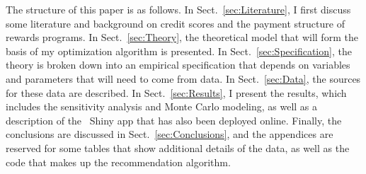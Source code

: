 The structure of this paper is as follows. 
In Sect.~\ref{sec:Literature}, I first discuss some literature and background on credit scores and the payment structure of rewards programs. 
In Sect.~\ref{sec:Theory}, the theoretical model that will form the basis of my optimization algorithm is presented. 
In Sect.~\ref{sec:Specification}, the theory is broken down into an empirical specification that depends on variables and parameters that will need to come from data.
In Sect.~\ref{sec:Data}, the sources for these data are described. 
In Sect.~\ref{sec:Results}, I present the results, which includes the sensitivity analysis and Monte Carlo modeling, as well as a description of the \sR\ \textsf{Shiny} app that has also been deployed online. 
Finally, the conclusions are discussed in Sect.~\ref{sec:Conclusions}, and the appendices are reserved for some tables that show additional details of the data, as well as the code that makes up the recommendation algorithm.
